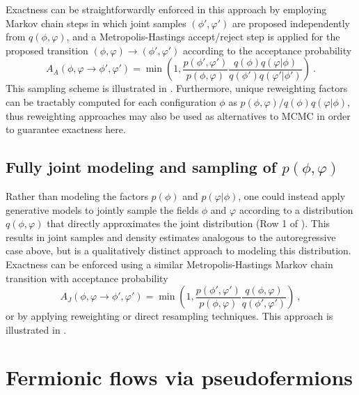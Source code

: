 \documentclass[aps,prd,twocolumn,nofootinbib,superscriptaddress,preprintnumbers]{revtex4-1}
\begin{document}
Exactness can be straightforwardly enforced in this approach by employing Markov chain steps in which joint samples $(\phi',\varphi')$ are proposed independently from $q(\phi,\varphi)$, and a Metropolis-Hastings accept/reject step is applied for the proposed transition $(\phi,\varphi) \rightarrow (\phi',\varphi')$ according to the acceptance probability
%
\begin{equation}\label{eq:autoregressive-acc}
    A_A(\phi,\varphi \rightarrow \phi',\varphi') = \min\left(1, \frac{p(\phi',\varphi')}{p(\phi,\varphi)}\frac{q(\phi)q(\varphi|\phi)}{q(\phi')q(\varphi'|\phi')} \right)\ .
\end{equation}
%
This sampling scheme is illustrated in . Furthermore, unique reweighting factors can be tractably computed for each configuration $\phi$ as $p(\phi,\varphi) / q(\phi)q(\varphi|\phi)$, thus reweighting approaches may also be used as alternatives to MCMC in order to guarantee exactness here.


\subsection{Fully joint modeling and sampling of \texorpdfstring{$p(\phi,\varphi)$}{p(phi,varphi)}}
\label{sec:joint-sampling}

Rather than modeling the factors $p(\phi)$ and $p(\varphi|\phi)$, one could instead apply generative models to jointly sample the fields $\phi$ and $\varphi$ according to a distribution $q(\phi,\varphi)$ that directly approximates the joint distribution (Row 1 of ). This results in joint samples and density estimates analogous to the autoregressive case above, but is a qualitatively distinct approach to modeling this distribution. Exactness can be enforced using a similar Metropolis-Hastings Markov chain transition with acceptance probability
%
\begin{equation}\label{eq:joint-acc}
    A_J(\phi,\varphi \rightarrow \phi',\varphi') = \min\left(1, \frac{p(\phi',\varphi')}{p(\phi,\varphi)}\frac{q(\phi,\varphi)}{q(\phi',\varphi')} \right)\ ,
\end{equation}
%
or by applying reweighting or direct resampling techniques. This approach is illustrated in .


\section{Fermionic flows via pseudofermions}
\label{sec:fermion-flows}
\end{document}
